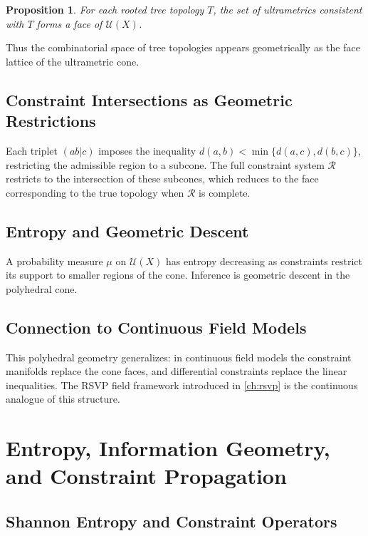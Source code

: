 \documentclass[12pt,a4paper,oneside]{book}
\numberwithin{equation}{chapter}
\theoremstyle{plain}
\newtheorem{proposition}[theorem]{Proposition}
\theoremstyle{definition}
\theoremstyle{remark}
\begin{document}
\begin{proposition}
For each rooted tree topology $T$, the set of ultrametrics consistent
with $T$ forms a face of $\mathcal{U}(X)$.
\end{proposition}

Thus the combinatorial space of tree topologies appears geometrically
as the face lattice of the ultrametric cone.

\section{Constraint Intersections as Geometric Restrictions}

Each triplet $(ab|c)$ imposes the inequality
$d(a,b) < \min\{d(a,c), d(b,c)\}$, restricting the admissible region
to a subcone. The full constraint system $\mathcal{R}$ restricts to
the intersection of these subcones, which reduces to the face
corresponding to the true topology when $\mathcal{R}$ is complete.

\section{Entropy and Geometric Descent}

A probability measure $\mu$ on $\mathcal{U}(X)$ has entropy decreasing
as constraints restrict its support to smaller regions of the cone.
Inference is geometric descent in the polyhedral cone.

\section{Connection to Continuous Field Models}

This polyhedral geometry generalizes: in continuous field models the
constraint manifolds replace the cone faces, and differential
constraints replace the linear inequalities. The RSVP field framework
introduced in \cref{ch:rsvp} is the continuous analogue of this
structure.


\chapter[Entropy, Information Geometry, and Constraints]{Entropy, Information Geometry, and Constraint Propagation}
\label{ch:information}

\section{Shannon Entropy and Constraint Operators}
\end{document}
